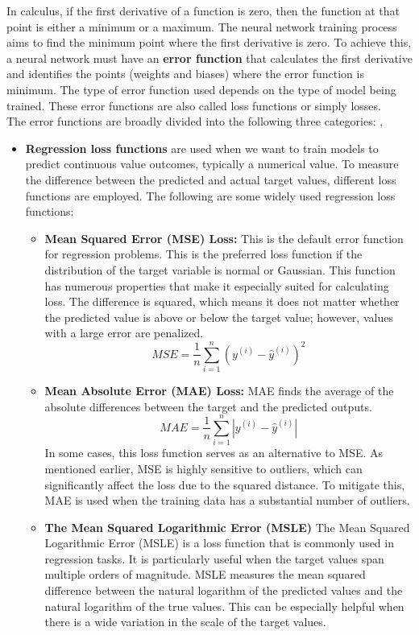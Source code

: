 In calculus, if the first derivative of a function is zero, then the function at that point is either a minimum or a maximum. The neural network training process aims to find the minimum point where the first derivative is zero. To achieve this, a neural network must have an \textbf{error function} that calculates the first derivative and identifies the points (weights and biases) where the error function is minimum. The type of error function used depends on the type of model being trained. These error functions are also called loss functions or simply losses.\\

The error functions are broadly divided into the following three categories: \cite{ansari2020building}, \cite{heaton2018ian}\\
\begin{itemize}
    \item \textbf{Regression loss functions} are used when we want to train models to predict continuous value outcomes, typically a numerical value. To measure the difference between the predicted and actual target values, different loss functions are employed. The following are some widely used regression loss functions:\\
    \begin{itemize}
    \item \textbf{Mean Squared Error (MSE) Loss:} This is the default error function for regression problems. This is the preferred loss function if the distribution of the target variable is normal or Gaussian. This function has numerous properties that make it especially suited for calculating loss. The difference is squared, which means it does not matter whether the predicted value is above or below the target value; however, values with a large error are penalized.\\
    $$MSE=\frac{1}{n}\sum_{i=1}^{n}(y^{(i)}-\hat{y}^{(i)})^{2}$$
    \item  \textbf{Mean Absolute Error (MAE) Loss:}  MAE finds the average of the absolute differences between the target and the predicted outputs.
    $$MAE=\frac{1}{n}\sum_{i=1}^{n}|y^{(i)}-\hat{y}^{(i)}|$$
    In some cases, this loss function serves as an alternative to MSE. As mentioned earlier, MSE is highly sensitive to outliers, which can significantly affect the loss due to the squared distance. To mitigate this, MAE is used when the training data has a substantial number of outliers.
    \item \textbf{The Mean Squared Logarithmic Error (MSLE)} The Mean Squared Logarithmic Error (MSLE) is a loss function that is commonly used in regression tasks. It is particularly useful when the target values span multiple orders of magnitude. MSLE measures the mean squared difference between the natural logarithm of the predicted values and the natural logarithm of the true values. This can be especially helpful when there is a wide variation in the scale of the target values.

\end{itemize}
\end{itemize}
